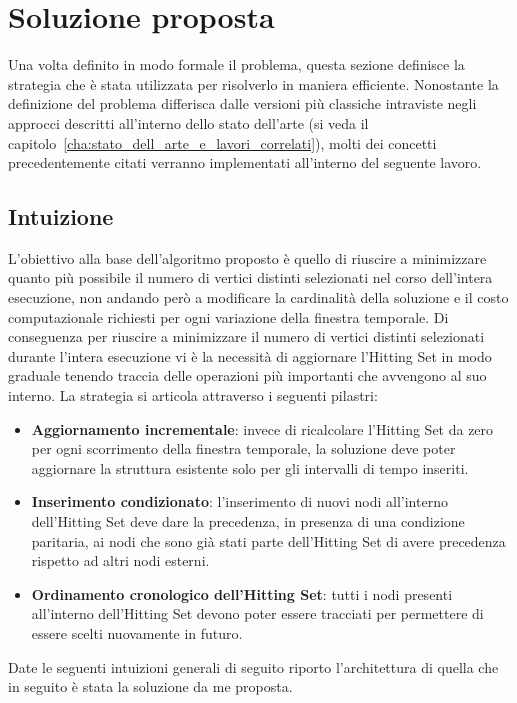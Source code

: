 
\section{Soluzione proposta}\label{sec:soluzione_proposta}

Una volta definito in modo formale il problema, questa sezione definisce la strategia che è stata utilizzata per risolverlo in maniera efficiente.
Nonostante la definizione del problema differisca dalle versioni più classiche intraviste negli approcci descritti all'interno dello stato dell'arte (si veda il capitolo~\ref{cha:stato_dell_arte_e_lavori_correlati}), molti dei concetti precedentemente citati verranno implementati all'interno del seguente lavoro.

\subsection{Intuizione}

L'obiettivo alla base dell'algoritmo proposto è quello di riuscire a minimizzare quanto più possibile il numero di vertici distinti selezionati nel corso dell'intera esecuzione, non andando però a modificare la cardinalità della soluzione e il costo computazionale richiesti per ogni variazione della finestra temporale.
Di conseguenza per riuscire a minimizzare il numero di vertici distinti selezionati durante l'intera esecuzione vi è la necessità di aggiornare l'Hitting Set in modo graduale tenendo traccia delle operazioni più importanti che avvengono al suo interno.
La strategia si articola attraverso i seguenti pilastri:
\begin{itemize}
    \item \textbf{Aggiornamento incrementale}: invece di ricalcolare l'Hitting Set da zero per ogni scorrimento della finestra temporale, la soluzione deve poter aggiornare la struttura esistente solo per gli intervalli di tempo inseriti.
    \item \textbf{Inserimento condizionato}: l'inserimento di nuovi nodi all'interno dell'Hitting Set deve dare la precedenza, in presenza di una condizione paritaria, ai nodi che sono già stati parte dell'Hitting Set di avere precedenza rispetto ad altri nodi esterni.
    \item \textbf{Ordinamento cronologico dell'Hitting Set}: tutti i nodi presenti all'interno dell'Hitting Set devono poter essere tracciati per permettere di essere scelti nuovamente in futuro.
\end{itemize}
Date le seguenti intuizioni generali di seguito riporto l'architettura di quella che in seguito è stata la soluzione da me proposta.

